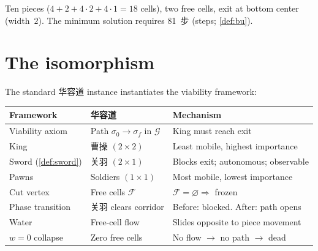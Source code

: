 Ten pieces ($4 + 2 + 4 \cdot 2 + 4 \cdot 1 = 18$ cells), two free
cells, exit at bottom center (width~$2$). The minimum solution requires
81~步 (steps; \cref{def:bu}).

\section{The isomorphism}

\begin{theorem}[华容道 $=$ viability maintenance]\label{thm:huarongdao}
The standard 华容道 instance instantiates the viability framework:
\begin{center}
\begin{tabular}{@{}lp{4cm}p{5cm}@{}}
\toprule
\textbf{Framework} & \textbf{华容道} & \textbf{Mechanism} \\
\midrule
Viability axiom & Path $\sigma_0 \to \sigma_f$ in $\mathcal{G}$ &
King must reach exit \\
King & 曹操 $(2{\times}2)$ & Least mobile, highest importance \\
Sword (\cref{def:sword}) & 关羽 $(2{\times}1)$ & Blocks exit;
autonomous; observable \\
Pawns & Soldiers $(1{\times}1)$ & Most mobile, lowest importance \\
Cut vertex & Free cells $\mathcal{F}$ &
$\mathcal{F} = \varnothing \Rightarrow$ frozen \\
Phase transition & 关羽 clears corridor & Before: blocked. After:
path opens \\
Water & Free-cell flow & Slides opposite to piece movement \\
$w = 0$ collapse & Zero free cells & No flow $\to$ no path $\to$
dead \\
\bottomrule
\end{tabular}
\end{center}
\end{theorem}

